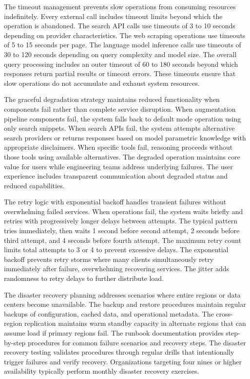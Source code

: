 The timeout management prevents slow operations from consuming resources indefinitely. Every external call includes timeout limits beyond which the operation is abandoned. The search API calls use timeouts of 3 to 10 seconds depending on provider characteristics. The web scraping operations use timeouts of 5 to 15 seconds per page. The language model inference calls use timeouts of 30 to 120 seconds depending on query complexity and model size. The overall query processing includes an outer timeout of 60 to 180 seconds beyond which responses return partial results or timeout errors. These timeouts ensure that slow operations do not accumulate and exhaust system resources.

The graceful degradation strategy maintains reduced functionality when components fail rather than complete service disruption. When augmentation pipeline components fail, the system falls back to default mode operation using only search snippets. When search APIs fail, the system attempts alternative search providers or returns responses based on model parametric knowledge with appropriate disclaimers. When specific tools fail, reasoning proceeds without those tools using available alternatives. The degraded operation maintains core value for users while engineering teams address underlying failures. The user experience includes transparent communication about degraded status and reduced capabilities.

The retry logic with exponential backoff handles transient failures without overwhelming failed services. When operations fail, the system waits briefly and retries with progressively longer delays between attempts. The typical pattern tries immediately, then waits 1 second before second attempt, 2 seconds before third attempt, and 4 seconds before fourth attempt. The maximum retry count limits total attempts to 3 or 4 to prevent excessive delays. The exponential backoff prevents retry storms where many clients simultaneously retry immediately after failure, overwhelming recovering services. The jitter adds randomness to retry delays to further distribute load.

The disaster recovery planning addresses scenarios where entire regions or data centers become unavailable. The backup and restore procedures maintain regular backups of configuration, cached data, and operational metadata. The cross-region replication maintains warm standby capacity in alternate regions that can assume load if primary regions fail. The runbook documentation provides step-by-step procedures for common failure scenarios and recovery steps. The disaster recovery testing validates procedures through regular drills that intentionally trigger failures and verify recovery. Organizations targeting four nines or higher availability typically perform monthly disaster recovery exercises.

